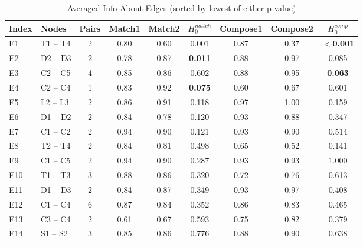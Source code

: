 \documentclass[12pt]{article}
\begin{document}
\begin{table*}\begin{footnotesize}\begin{center}\caption{Averaged Info About Edges (sorted by lowest of either p-value)}\label{table:testedEdgesTable}\begin{tabular}
{llccccccc}
Index & Nodes & Pairs & Match1 & Match2 & $H_0^{match} $ & Compose1 & Compose2 &  $H_0^{comp}$ \bigstrut \\
\toprule[0.16em]
E1 & T1 -- T4 & 2 & 0.80 & 0.60 & 0.001 & 0.87 & 0.37 & \textbf{$<$0.001}\\
E2 & D2 -- D3 & 2 & 0.78 & 0.87 & \textbf{0.011} & 0.88 & 0.97 & 0.085\\
E3 & C2 -- C5 & 4 & 0.85 & 0.86 & 0.602 & 0.88 & 0.95 & \textbf{0.063}\\
E4 & C2 -- C4 & 1 & 0.83 & 0.92 & \textbf{0.075} & 0.60 & 0.67 & 0.601\\
\midrule[0.16em]
E5 & L2 -- L3 & 2 & 0.86 & 0.91 & 0.118 & 0.97 & 1.00 & 0.159\\
E6 & D1 -- D2 & 2 & 0.84 & 0.78 & 0.120 & 0.93 & 0.88 & 0.347\\
E7 & C1 -- C2 & 2 & 0.94 & 0.90 & 0.121 & 0.93 & 0.90 & 0.514\\
E8 & T2 -- T4 & 2 & 0.84 & 0.81 & 0.498 & 0.65 & 0.52 & 0.141\\
E9 & C1 -- C5 & 2 & 0.94 & 0.90 & 0.287 & 0.93 & 0.93 & 1.000\\
E10 & T1 -- T3 & 3 & 0.88 & 0.86 & 0.320 & 0.72 & 0.76 & 0.613\\
E11 & D1 -- D3 & 2 & 0.84 & 0.87 & 0.349 & 0.93 & 0.97 & 0.408\\
E12 & C1 -- C4 & 6 & 0.87 & 0.84 & 0.352 & 0.86 & 0.83 & 0.465\\
E13 & C3 -- C4 & 2 & 0.61 & 0.67 & 0.593 & 0.75 & 0.82 & 0.379\\
E14 & S1 -- S2 & 3 & 0.85 & 0.86 & 0.776 & 0.88 & 0.90 & 0.638\\
\bottomrule[0.13em]\end{tabular}\end{center}\end{footnotesize}\end{table*}
\end{document}
